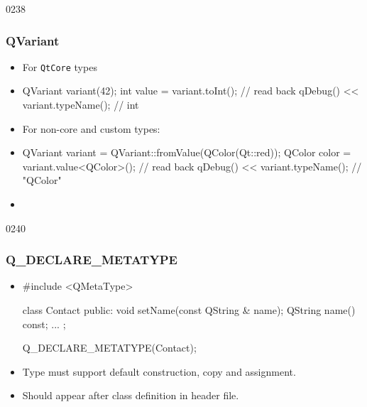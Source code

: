 \begin{slide}[fragile]{0238}\frametitle{QVariant}
\begin{itemize}
  \item For \texttt{QtCore} types  
  \item[] \begin{cpp}
QVariant variant(42);
int value = variant.toInt(); // read back
qDebug() << variant.typeName(); // int
\end{cpp}\vspace*{3mm}
\item For non-core and custom types:
  \item[] \begin{cpp}
QVariant variant = QVariant::fromValue(QColor(Qt::red));
QColor color = variant.value<QColor>(); // read back
qDebug() << variant.typeName(); // "QColor"
\end{cpp}\vspace*{3mm}
\item[] 
\end{itemize}
\end{slide}

\begin{slide}[fragile]{0240}
\frametitle{Q\_DECLARE\_METATYPE}
\begin{itemize}
\item[]
\begin{cpp}
#include <QMetaType>

class Contact
{
  public:
    void setName(const QString & name);
    QString name() const;
  ...
};

Q_DECLARE_METATYPE(Contact);
\end{cpp}\vspace*{5mm}
\item Type must support default construction, copy and assignment.
\item Should appear after class definition in header file.
\end{itemize}
\end{slide}

